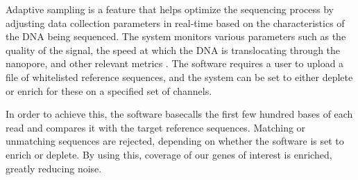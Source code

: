 Adaptive sampling is a feature that helps optimize the sequencing process by adjusting data collection parameters in real-time based on the characteristics of the DNA being sequenced. The system monitors various parameters such as the quality of the signal, the speed at which the DNA is translocating through the nanopore, and other relevant metrics \citep{ont_as}. The software requires a user to upload a file of whitelisted reference sequences, and the system can be set to either deplete or enrich for these on a specified set of channels. 

In order to achieve this, the software basecalls the first few hundred bases of each read and compares it with the target reference sequences. Matching or unmatching sequences are rejected, depending on whether the software is set to enrich or deplete. By using this, coverage of our genes of interest is enriched, greatly reducing noise.